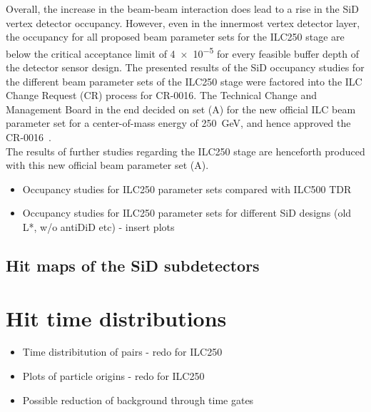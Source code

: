 Overall, the increase in the beam-beam interaction does lead to a rise in the SiD vertex detector occupancy.
However, even in the innermost vertex detector layer, the occupancy for all proposed beam parameter sets for the ILC250 stage are below the critical acceptance limit of \num{4e-5} for every feasible buffer depth of the detector sensor design.
The presented results of the SiD occupancy studies for the different beam parameter sets of the ILC250 stage were factored into the ILC Change Request (CR) process for CR-0016.
The Technical Change and Management Board in the end decided on set (A) for the new official ILC beam parameter set for a center-of-mass energy of \SI{250}{\GeV}, and hence approved the CR-0016~\cite{LCWS17_TCMBmeeting,CR-0016}.
\\The results of further studies regarding the ILC250 stage are henceforth produced with this new official beam parameter set (A).
\begin{itemize}
 \item Occupancy studies for ILC250 parameter sets compared with ILC500 TDR
 \item Occupancy studies for ILC250 parameter sets for different SiD designs (old L*, w/o antiDiD etc) - insert plots
\end{itemize}

\subsection{Hit maps of the SiD subdetectors}
\label{PairBkg:hitmaps}


\section{Hit time distributions}
\label{PairBkg:hittime}

\begin{itemize}
 \item Time distribitution of pairs - redo for ILC250
 \item Plots of particle origins - redo for ILC250
 \item Possible reduction of background through time gates
\end{itemize}

